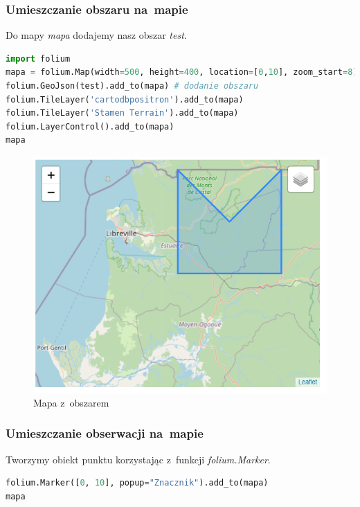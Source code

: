 \documentclass{article}
\begin{document}
\subsubsection{Umieszczanie obszaru na~mapie}
Do mapy \textit{mapa} dodajemy nasz obszar \textit{test}.
\begin{lstlisting}[language=Python, caption=Dodanie obszaru]
import folium
mapa = folium.Map(width=500, height=400, location=[0,10], zoom_start=8)
folium.GeoJson(test).add_to(mapa) # dodanie obszaru
folium.TileLayer('cartodbpositron').add_to(mapa)
folium.TileLayer('Stamen Terrain').add_to(mapa)
folium.LayerControl().add_to(mapa)
mapa
\end{lstlisting}
\begin{figure}[h] 
\begin{center}
\includegraphics[scale = 0.5]{"mapaobszar.PNG"}
\end{center}
\caption{Mapa z~obszarem}
\label{}
\end{figure}
\subsubsection{Umieszczanie obserwacji na~mapie}

Tworzymy obiekt punktu korzystając z~funkcji \textit{folium.Marker}.
\begin{lstlisting}[language=Python, caption=Dodanie obszaru]
folium.Marker([0, 10], popup="Znacznik").add_to(mapa)
mapa
\end{lstlisting}
\end{document}
